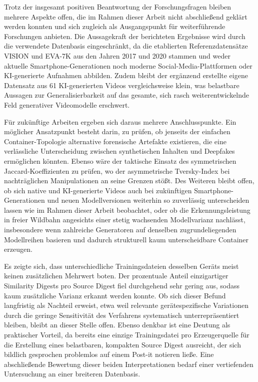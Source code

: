 Trotz der insgesamt positiven Beantwortung der Forschungsfragen bleiben mehrere Aspekte offen, die im Rahmen dieser Arbeit nicht abschließend geklärt werden konnten und sich zugleich als Ausgangspunkt für weiterführende Forschungen anbieten. Die Aussagekraft der berichteten Ergebnisse wird durch die verwendete Datenbasis eingeschränkt, da die etablierten Referenzdatensätze VISION und EVA-7K aus den Jahren 2017 und 2020 stammen und weder aktuelle Smartphone-Generationen noch moderne Social-Media-Plattformen oder KI-generierte Aufnahmen abbilden. Zudem bleibt der ergänzend erstellte eigene Datensatz aus 61 KI-generierten Videos vergleichsweise klein, was belastbare Aussagen zur Generalisierbarkeit auf das gesamte, sich rasch weiterentwickelnde Feld generativer Videomodelle erschwert.

Für zukünftige Arbeiten ergeben sich daraus mehrere Anschlusspunkte. Ein möglicher Ansatzpunkt besteht darin, zu prüfen, ob jenseits der einfachen Container-Topologie alternative forensische Artefakte existieren, die eine verlässliche Unterscheidung zwischen synthetischen Inhalten und Deepfakes ermöglichen könnten. Ebenso wäre der taktische Einsatz des symmetrischen Jaccard-Koeffizienten zu prüfen, wo der asymmetrische Tversky-Index bei nachträglichen Manipulationen an seine Grenzen stößt. Des Weiteren bleibt offen, ob sich native und KI-generierte Videos auch bei zukünftigen Smartphone-Generationen und neuen Modellversionen weiterhin so zuverlässig unterscheiden lassen wie im Rahmen dieser Arbeit beobachtet, oder ob die Erkennungsleistung in freier Wildbahn angesichts einer stetig wachsenden Modellvarianz nachlässt, insbesondere wenn zahlreiche Generatoren auf denselben zugrundeliegenden Modellreihen basieren und dadurch strukturell kaum unterscheidbare Container erzeugen. 

Es zeigte sich, dass unterschiedliche Trainingsdateien desselben Geräts meist keinen zusätzlichen Mehrwert boten. Der prozentuale Anteil einzigartiger Similarity Digests pro Source Digest fiel durchgehend sehr gering aus, sodass kaum zusätzliche Varianz erkannt werden konnte. Ob sich dieser Befund langfristig als Nachteil erweist, etwa weil relevante gerätespezifische Variationen durch die geringe Sensitivität des Verfahrens systematisch unterrepräsentiert bleiben, bleibt an dieser Stelle offen. Ebenso denkbar ist eine Deutung als praktischer Vorteil, da bereits eine einzige Trainingsdatei pro Erzeugerquelle für die Erstellung eines belastbaren, kompakten Source Digest ausreicht, der sich bildlich gesprochen problemlos auf einem Post-it notieren ließe. Eine abschließende Bewertung dieser beiden Interpretationen bedarf einer vertiefenden Untersuchung an einer breiteren Datenbasis.

